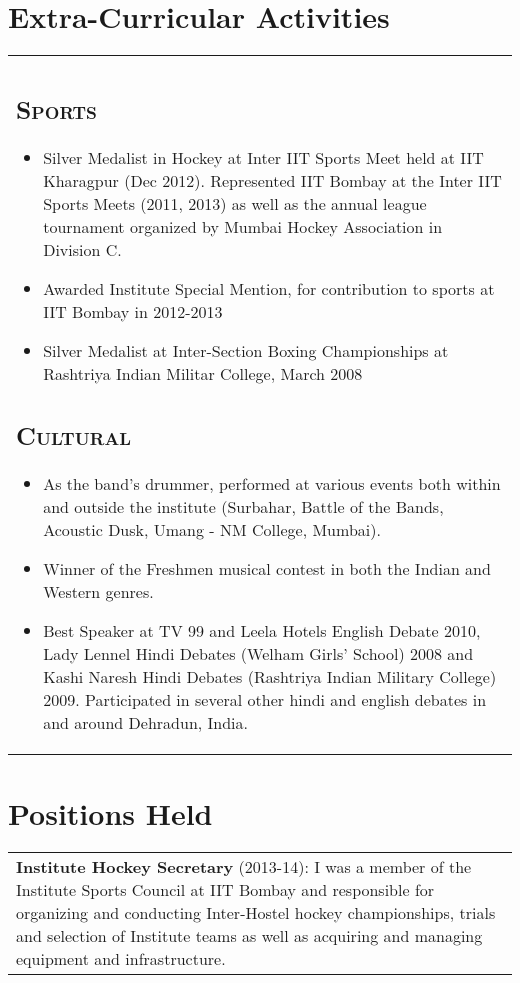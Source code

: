 \documentclass[a4paper,8pt]{article} %
\begin{document}
{\section{Extra-Curricular Activities}
\begin{tabular}{p{16.5cm}}
\subsection*{\textsc{Sports}}
	\begin{itemize}
		\item Silver Medalist in Hockey at Inter IIT Sports Meet held at IIT Kharagpur (Dec 2012). Represented IIT Bombay at the Inter IIT Sports Meets (2011, 2013) as well as the annual league tournament organized by Mumbai Hockey Association in Division C.
		\item Awarded Institute Special Mention, for contribution to sports at IIT Bombay in 2012-2013
		\item Silver Medalist at Inter-Section Boxing Championships at Rashtriya Indian Militar College, March 2008
	\end{itemize}

\subsection*{\textsc{Cultural}}
\begin{itemize}
	\item As the band's drummer, performed at various events both within and outside the institute (Surbahar, Battle of the Bands, Acoustic Dusk, Umang - NM College, Mumbai).
	\item Winner of the Freshmen musical contest in both the Indian and  Western genres. 
	\item Best Speaker at TV 99 and Leela Hotels English Debate 2010, Lady Lennel Hindi Debates (Welham Girls' School) 2008 and Kashi Naresh Hindi Debates (Rashtriya Indian Military College) 2009. Participated in several other hindi and english debates in and around Dehradun, India.  
\end{itemize}
\end{tabular}

\section{Positions Held}
\begin{tabular}{p{16.5cm}}
\textbf{Institute Hockey Secretary} (2013-14):
 I was a member of the Institute Sports Council at IIT Bombay and responsible for organizing and conducting Inter-Hostel hockey championships, trials and selection of Institute teams as well as acquiring and managing equipment and infrastructure.
\end{tabular}
\vspace{8pt}

}
\end{document}
